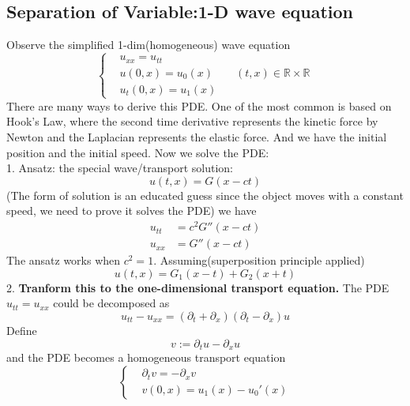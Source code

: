 \documentclass[a4paper,11pt,oneside,fleqn]{book}
\theoremstyle{definition}
\theoremstyle{remark}
\begin{document}
\subsection{Separation of Variable:1-D wave equation}
Observe the simplified 1-dim(homogeneous) wave equation\\
\begin{equation}\label{WE}
\left\{
\begin{aligned}
	&u_{xx} = u_{tt} \\
	&u(0, x) = u_0(x) \qquad (t, x) \in \mathbb{R} \times \mathbb{R}\\
	&u_t(0, x) = u_1(x)
\end{aligned}
\right.
\end{equation}
There are many ways to derive this PDE. One of the most common is based on Hook's Law, where the second time derivative represents the kinetic force by Newton and the Laplacian represents the elastic force. And we have the initial position and the initial speed. Now we solve the PDE: \\
1. Ansatz: the special wave/transport solution:
\begin{equation*}
	u(t, x) = G(x - ct)
\end{equation*}
(The form of solution is an educated guess since the object moves with a constant speed, we need to prove it solves the PDE)
we have
\begin{align*}
	u_{tt} &= c^2 G''(x - ct)\\
	u_{xx} &= G''(x-ct)
\end{align*}
The ansatz works when $c^2 = 1$. Assuming(superposition principle applied)
\begin{equation*}
	u(t, x) = G_1(x - t) + G_2( x + t)
\end{equation*}
2. \textbf{Tranform this to the one-dimensional transport equation.} The PDE $u_{tt} = u_{xx}$ could be decomposed as
\begin{equation*}
	u_{tt} - u_{xx} = (\partial_t + \partial_x)(\partial_t - \partial_x)u 
\end{equation*}
Define
\begin{equation*}
	v:= \partial_t u - \partial_x u
\end{equation*}
and the PDE becomes a homogeneous transport equation
\begin{equation*}
\left\{
\begin{aligned}
	&\partial_t v = - \partial_x v\\
	& v(0, x) =	u_1(x) - u_0'(x)
\end{aligned} 
\right.
\end{equation*}
\end{document}
